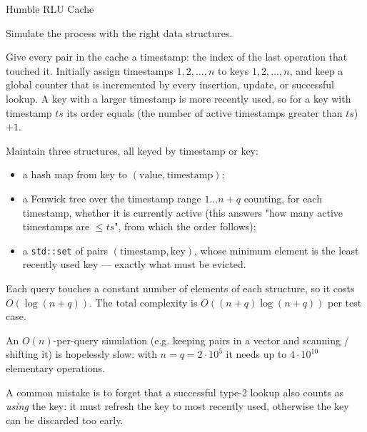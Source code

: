 \begin{tutorial}{Humble RLU Cache}

Simulate the process with the right data structures.

Give every pair in the cache a timestamp: the index of the last operation that touched it. Initially assign timestamps $1, 2, \ldots, n$ to keys $1, 2, \ldots, n$, and keep a global counter that is incremented by every insertion, update, or successful lookup. A key with a larger timestamp is more recently used, so for a key with timestamp $ts$ its order equals (the number of active timestamps greater than $ts$) $+ 1$.

Maintain three structures, all keyed by timestamp or key:

\begin{itemize}
  \item a hash map from key to $(\text{value}, \text{timestamp})$;
  \item a Fenwick tree over the timestamp range $1 \ldots n+q$ counting, for each timestamp, whether it is currently active (this answers "how many active timestamps are $\le ts$", from which the order follows);
  \item a \texttt{std::set} of pairs $(\text{timestamp}, \text{key})$, whose minimum element is the least recently used key --- exactly what must be evicted.
\end{itemize}

Each query touches a constant number of elements of each structure, so it costs $O(\log(n+q))$. The total complexity is $O((n+q) \log (n+q))$ per test case.

An $O(n)$-per-query simulation (e.g. keeping pairs in a vector and scanning / shifting it) is hopelessly slow: with $n = q = 2 \cdot 10^5$ it needs up to $4 \cdot 10^{10}$ elementary operations.

A common mistake is to forget that a successful type-2 lookup also counts as \emph{using} the key: it must refresh the key to most recently used, otherwise the key can be discarded too early.


\end{tutorial}
